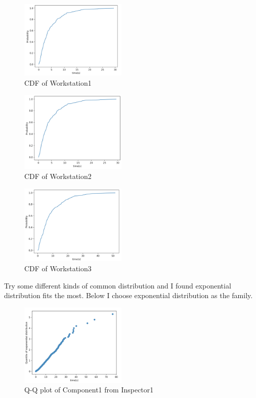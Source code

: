 \documentclass{article}
\begin{document}
\begin{figure}[htbp]
\begin{center}
\includegraphics[width=2in]{cdf4.png}
\caption{CDF of Workstation1}
\label{cdf4}
\end{center}
\end{figure}

\begin{figure}[htbp]
\begin{center}
\includegraphics[width=2in]{cdf5.png}
\caption{CDF of Workstation2}
\label{cdf5}
\end{center}
\end{figure}

\begin{figure}[htbp]
\begin{center}
\includegraphics[width=2in]{cdf6.png}
\caption{CDF of Workstation3}
\label{cdf6}
\end{center}
\end{figure}
Try some different kinds of common distribution and I found exponential distribution fits the most.
Below I choose exponential distribution as the family.

\begin{figure}[htbp]
\begin{center}
\includegraphics[width=2in]{exp1.png}
\caption{Q-Q plot of Component1 from Inspector1}
\label{exp1}
\end{center}
\end{figure}
\end{document}
